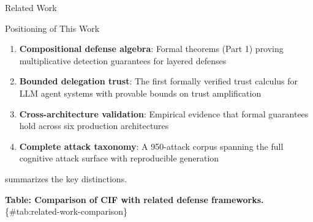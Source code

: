 \documentclass[
  ignorenonframetext,
]{beamer}
\providecommand{\tightlist}{%
  \setlength{\itemsep}{0pt}\setlength{\parskip}{0pt}}
\begin{document}
\begin{frame}{Related Work}
\begin{block}{Positioning of This Work}
\begin{enumerate}
\tightlist
\item
  \textbf{Compositional defense algebra}: Formal theorems (Part 1)
  proving multiplicative detection guarantees for layered defenses
\item
  \textbf{Bounded delegation trust}: The first formally verified trust
  calculus for LLM agent systems with provable bounds on trust
  amplification
\item
  \textbf{Cross-architecture validation}: Empirical evidence that formal
  guarantees hold across six production architectures
\item
  \textbf{Complete attack taxonomy}: A 950-attack corpus spanning the
  full cognitive attack surface with reproducible generation
\end{enumerate}

 summarizes the key distinctions.

\textbf{Table: Comparison of CIF with related defense frameworks.}
\{\#tab:related-work-comparison\}


\end{block}
\end{frame}
\end{document}

